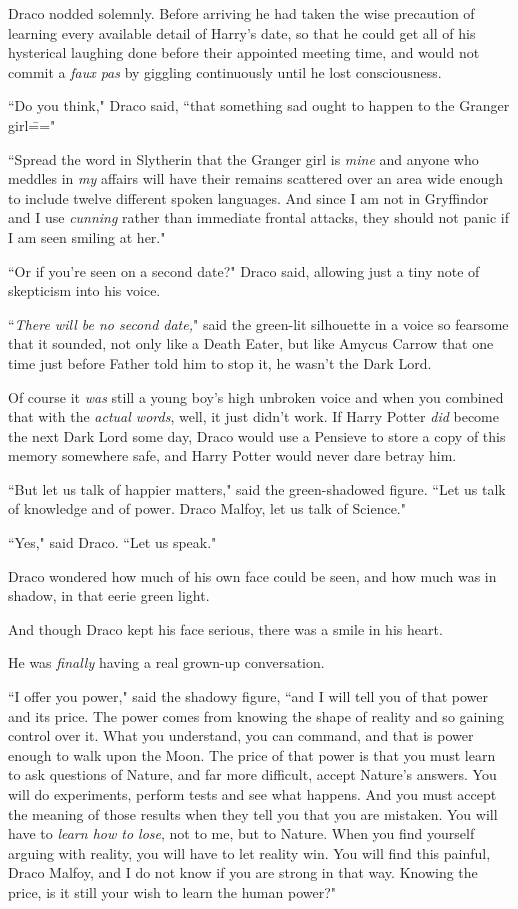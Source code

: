 Draco nodded solemnly. Before arriving he had taken the wise precaution of learning every available detail of Harry's date, so that he could get all of his hysterical laughing done before their appointed meeting time, and would not commit a \emph{faux pas} by giggling continuously until he lost consciousness.

``Do you think," Draco said, ``that something sad ought to happen to the Granger girl\==="

``Spread the word in Slytherin that the Granger girl is \emph{mine} and anyone who meddles in \emph{my} affairs will have their remains scattered over an area wide enough to include twelve different spoken languages. And since I am not in Gryffindor and I use \emph{cunning} rather than immediate frontal attacks, they should not panic if I am seen smiling at her."

``Or if you're seen on a second date?" Draco said, allowing just a tiny note of skepticism into his voice.

``\emph{There will be no second date,}" said the green-lit silhouette in a voice so fearsome that it sounded, not only like a Death Eater, but like Amycus Carrow that one time just before Father told him to stop it, he wasn't the Dark Lord.

Of course it \emph{was} still a young boy's high unbroken voice and when you combined that with the \emph{actual words}, well, it just didn't work. If Harry Potter \emph{did} become the next Dark Lord some day, Draco would use a Pensieve to store a copy of this memory somewhere safe, and Harry Potter would never dare betray him.

``But let us talk of happier matters," said the green-shadowed figure. ``Let us talk of knowledge and of power. Draco Malfoy, let us talk of Science."

``Yes," said Draco. ``Let us speak."

Draco wondered how much of his own face could be seen, and how much was in shadow, in that eerie green light.

And though Draco kept his face serious, there was a smile in his heart.

He was \emph{finally} having a real grown-up conversation.

``I offer you power," said the shadowy figure, ``and I will tell you of that power and its price. The power comes from knowing the shape of reality and so gaining control over it. What you understand, you can command, and that is power enough to walk upon the Moon. The price of that power is that you must learn to ask questions of Nature, and far more difficult, accept Nature's answers. You will do experiments, perform tests and see what happens. And you must accept the meaning of those results when they tell you that you are mistaken. You will have to \emph{learn how to lose}, not to me, but to Nature. When you find yourself arguing with reality, you will have to let reality win. You will find this painful, Draco Malfoy, and I do not know if you are strong in that way. Knowing the price, is it still your wish to learn the human power?"

